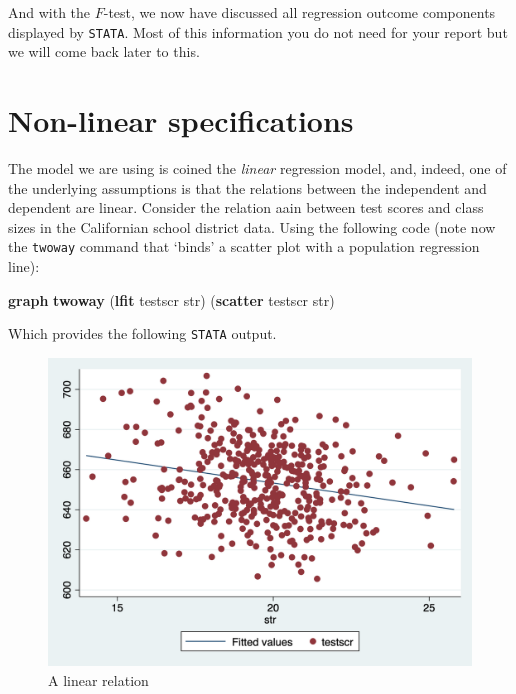 \documentclass[
]{book}
\newenvironment{Shaded}{\begin{snugshade}}{\end{snugshade}}
\newcommand{\KeywordTok}[1]{\textcolor[rgb]{0.13,0.29,0.53}{\textbf{#1}}}
\newcommand{\NormalTok}[1]{#1}
\begin{document}
And with the \(F\)-test, we now have discussed all regression outcome components displayed by \texttt{STATA}. Most of this information you do not need for your report but we will come back later to this.

\hypertarget{sec:nonlinear}{%
\section{Non-linear specifications}\label{sec:nonlinear}}

The model we are using is coined the \emph{linear} regression model, and, indeed, one of the underlying assumptions is that the relations between the independent and dependent are linear. Consider the relation aain between test scores and class sizes in the Californian school district data. Using the following code (note now the \texttt{twoway} command that `binds' a scatter plot with a population regression line):

\begin{Shaded}
\begin{Highlighting}[]
\KeywordTok{graph} \KeywordTok{twoway}\NormalTok{ (}\KeywordTok{lfit}\NormalTok{ testscr str) (}\KeywordTok{scatter}\NormalTok{ testscr str)}
\end{Highlighting}
\end{Shaded}

Which provides the following \texttt{STATA} output.

\begin{figure}

{\centering \includegraphics[width=600px]{./figures/scatterlfit} 

}

\caption{A linear relation}\label{fig:scatterlfitcaschool}
\end{figure}
\end{document}
